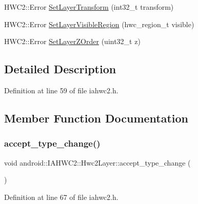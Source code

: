 \begin{DoxyCompactItemize}
\item 
H\+W\+C2\+::\+Error \mbox{\hyperlink{classandroid_1_1IAHWC2_1_1Hwc2Layer_af8f8b97ad63f413d0c16d8e95662c054}{Set\+Layer\+Transform}} (int32\+\_\+t transform)
\item 
H\+W\+C2\+::\+Error \mbox{\hyperlink{classandroid_1_1IAHWC2_1_1Hwc2Layer_af1a6d7d40ce690e300ff37b933ac44eb}{Set\+Layer\+Visible\+Region}} (hwc\+\_\+region\+\_\+t visible)
\item 
H\+W\+C2\+::\+Error \mbox{\hyperlink{classandroid_1_1IAHWC2_1_1Hwc2Layer_a73c282c185dbd4c86d86f666eaf241ad}{Set\+Layer\+Z\+Order}} (uint32\+\_\+t z)
\end{DoxyCompactItemize}


\subsection{Detailed Description}


Definition at line 59 of file iahwc2.\+h.



\subsection{Member Function Documentation}
\mbox{\label{classandroid_1_1IAHWC2_1_1Hwc2Layer_a8aaa19adc3ed5349d78178585bb9cc74}} 
\subsubsection{\texorpdfstring{accept\+\_\+type\+\_\+change()}{accept\_type\_change()}}
{\footnotesize\ttfamily void android\+::\+I\+A\+H\+W\+C2\+::\+Hwc2\+Layer\+::accept\+\_\+type\+\_\+change (\begin{DoxyParamCaption}{ }\end{DoxyParamCaption})\hspace{0.3cm}{\ttfamily [inline]}}



Definition at line 67 of file iahwc2.\+h.


\begin{DoxyCode}{0}
\end{DoxyCode}
\mbox{\label{classandroid_1_1IAHWC2_1_1Hwc2Layer_a743e0967bebe3cfefe1bff652cfae999}} 
